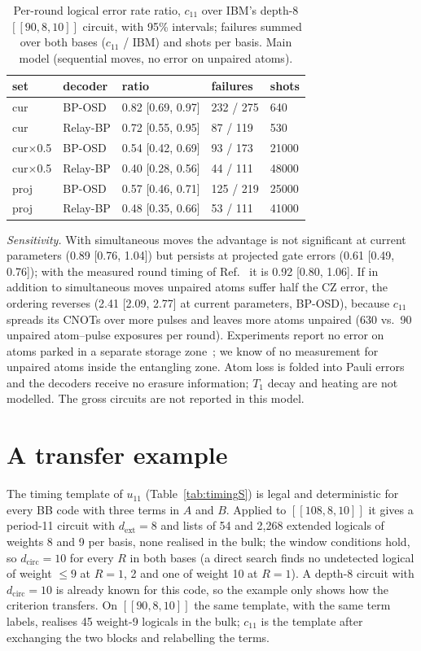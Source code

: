 \documentclass[aps,prl,twocolumn,superscriptaddress,nofootinbib]{revtex4-2}
\newcommand{\dcirc}{d_{\mathrm{circ}}}
\newcommand{\dext}{d_{\mathrm{ext}}}
\newcommand{\code}[1]{[[#1]]}
\begin{document}
\begin{table}[h]
\caption{Per-round logical error rate ratio, $c_{11}$ over IBM's depth-8 $\code{90,8,10}$
circuit, with 95\% intervals; failures summed over both bases ($c_{11}$ / IBM) and shots per
basis. Main model (sequential moves, no error on unpaired atoms).}
\label{tab:naratio}
\begin{ruledtabular}
\begin{tabular}{lllll}
set & decoder & ratio & failures & shots\\
\hline
cur & BP-OSD & 0.82 [0.69, 0.97] & 232 / 275 & 640\\
cur & Relay-BP & 0.72 [0.55, 0.95] & 87 / 119 & 530\\
cur$\times$0.5 & BP-OSD & 0.54 [0.42, 0.69] & 93 / 173 & 21000\\
cur$\times$0.5 & Relay-BP & 0.40 [0.28, 0.56] & 44 / 111 & 48000\\
proj & BP-OSD & 0.57 [0.46, 0.71] & 125 / 219 & 25000\\
proj & Relay-BP & 0.48 [0.35, 0.66] & 53 / 111 & 41000\\
\end{tabular}
\end{ruledtabular}
\end{table}

\emph{Sensitivity.} With simultaneous moves the advantage is not significant at current
parameters (0.89 [0.76, 1.04]) but persists at projected gate errors (0.61 [0.49, 0.76]);
with the measured round timing of Ref.~\cite{Bluvstein2025} it is 0.92 [0.80, 1.06]. If in
addition to simultaneous moves unpaired atoms suffer half the CZ error, the ordering
reverses (2.41 [2.09, 2.77] at current parameters, BP-OSD), because $c_{11}$ spreads its
CNOTs over more pulses and leaves more atoms unpaired (630 vs.\ 90 unpaired atom--pulse
exposures per round). Experiments report no error on atoms parked in a separate storage
zone~\cite{Bluvstein2024,Bluvstein2025}; we know of no measurement for unpaired atoms inside
the entangling zone. Atom loss is folded into Pauli errors and the decoders receive no
erasure information; $T_1$ decay and heating are not modelled. The gross circuits are not
reported in this model.

\section{A transfer example}\label{sm:transfer}
The timing template of $u_{11}$ (Table~\ref{tab:timingS}) is legal and deterministic for every BB code with
three terms in $A$ and $B$. Applied to $\code{108,8,10}$ it gives a period-11 circuit with
$\dext=8$ and lists of 54 and 2,268 extended logicals of weights 8 and 9 per basis, none
realised in the bulk; the window conditions hold, so $\dcirc=10$ for every $R$ in both
bases (a direct search finds no undetected logical of weight $\le9$ at $R=1$, 2 and one of
weight 10 at $R=1$). A depth-8 circuit with $\dcirc=10$ is already known for this code, so the
example only shows how the criterion transfers. On $\code{90,8,10}$ the same template, with the
same term labels, realises 45 weight-9 logicals in the bulk; $c_{11}$ is the template after
exchanging the two blocks and relabelling the terms.
\end{document}
